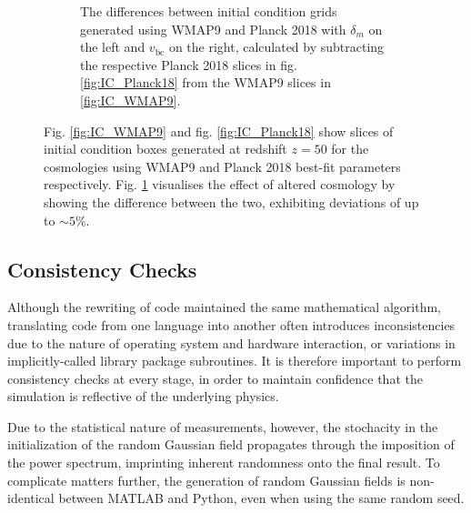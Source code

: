 \documentclass[floats,floatfix,showpacs,amssymb,prd,superscriptaddress,nofootinbib]{revtex4-2} %
\newcommand{\red}{\textcolor{red}}
\begin{document}
\begin{figure}
\begin{subfigure}[b]{0.9\textwidth}
         \caption{The differences between initial condition grids generated using WMAP9 and Planck 2018 with $\delta_m$ on the left and $v_{\text{bc}}$ on the right, calculated by subtracting the respective Planck 2018 slices in fig. \ref{fig:IC_Planck18} from the WMAP9 slices in \ref{fig:IC_WMAP9}.}
         \label{fig:IC_difference_WMAP9_Planck18}
     \end{subfigure}
        \caption{Fig. \ref{fig:IC_WMAP9} and fig. \ref{fig:IC_Planck18} show slices of initial condition boxes generated at redshift $z = 50$ for the cosmologies using WMAP9 and Planck 2018 best-fit parameters respectively. Fig. \ref{fig:IC_difference_WMAP9_Planck18} visualises the effect of altered cosmology by showing the difference between the two, exhibiting deviations of up to $\sim 5 \%$.}
        \label{fig:IC_WMAP9_Planck18}
\end{figure}

\subsection{Consistency Checks}
Although the rewriting of code maintained the same mathematical algorithm, translating code from one language into another often introduces inconsistencies due to the nature of operating system and hardware interaction, or variations in implicitly-called library package subroutines. It is therefore important to perform consistency checks at every stage, in order to maintain confidence that the simulation is reflective of the underlying physics.

Due to the statistical nature of measurements, however, the stochacity in the initialization of the random Gaussian field propagates through the imposition of the power spectrum, imprinting inherent randomness onto the final result. To complicate matters further, the generation of random Gaussian fields is non-identical between MATLAB and Python, even when using the same random seed. 
\end{document}
